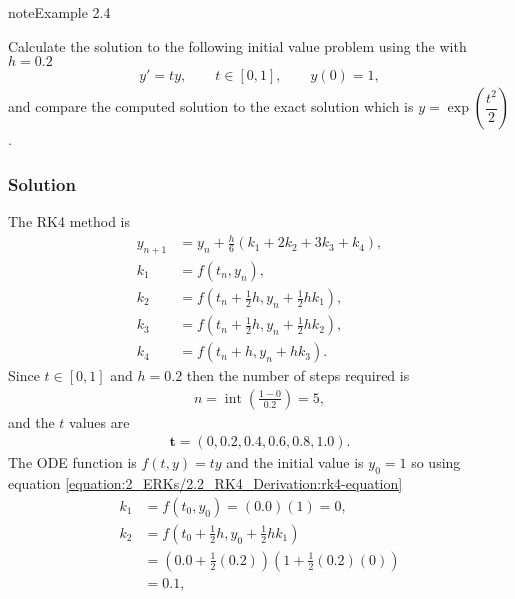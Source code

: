 \documentclass[letterpaper,10pt,english]{jupyterBook}
\begin{document}
\begin{sphinxadmonition}{note}{Example 2.4}

\sphinxAtStartPar
Calculate the solution to the following initial value problem using the {\hyperref[\detokenize{2_ERKs/2.2_RK4_Derivation:rk4-definition}]{}} with \(h = 0.2\)
\begin{align*}
    y'=ty, \qquad t\in [0,1], \qquad y(0)=1,
\end{align*}
\sphinxAtStartPar
and compare the computed solution to the exact solution which is \(y = \exp\left(\dfrac{t^2}{2}\right)\).
\subsubsection*{Solution}

\sphinxAtStartPar
The RK4 method is
\begin{align*}
    y_{n+1} &= y_n + \frac{h}{6}(k_1 + 2k_2 + 3k_3 + k_4), \\
    k_1 &= f(t_n, y_n), \\
    k_2 &= f(t_n + \frac{1}{2}h, y_n + \frac{1}{2}hk_1), \\
    k_3 &= f(t_n + \frac{1}{2}h, y_n + \frac{1}{2}hk_2), \\
    k_4 &= f(t_n + h, y_n + hk_3).
\end{align*}
\sphinxAtStartPar
Since \(t\in[0,1]\) and \(h=0.2\) then the number of steps required is
\begin{equation*}
\begin{split}n = \operatorname{int}\left(\frac{1 - 0}{0.2}\right) = 5, \end{split}
\end{equation*}
\sphinxAtStartPar
and the \(t\) values are
\begin{equation*}
\begin{split}\mathbf{t} = (0, 0.2, 0.4, 0.6, 0.8, 1.0).\end{split}
\end{equation*}
\sphinxAtStartPar
The ODE function is \(f(t, y) = ty\) and the initial value is \(y_0 = 1\) so using equation \eqref{equation:2_ERKs/2.2_RK4_Derivation:rk4-equation}
\begin{align*}
    k_1 &= f(t_0, y_0) = (0.0)(1) = 0, \\
    k_2 &= f(t_0 + \frac{1}{2}h, y_0 + \frac{1}{2}hk_1) \\
    &= (0.0 + \frac{1}{2}(0.2))(1 + \frac{1}{2}(0.2)(0)) \\
    &= 0.1, \\

\end{align*}
\end{sphinxadmonition}
\end{document}
